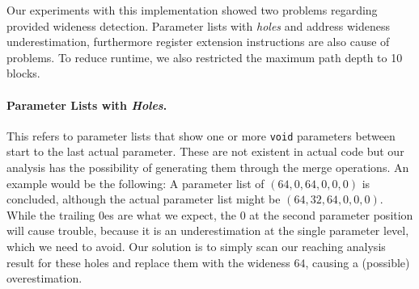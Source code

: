 %
%
%

Our experiments with this implementation showed two problems regarding provided wideness detection.  Parameter lists with \textit{holes} and address wideness underestimation, 
furthermore register extension instructions are also cause of problems. To reduce runtime, we also restricted the maximum path depth to 10 blocks.

\paragraph{Parameter Lists with \textit{Holes}.} This refers to parameter lists that show one or more \texttt{void} parameters between start to the last actual parameter. 
These are not existent in actual code but our analysis has the possibility of generating them through the merge operations. An example would be the following: 
A parameter list of $(64, 0, 64, 0, 0, 0)$ is concluded, although the actual parameter list might be $(64, 32, 64, 0, 0, 0)$. While the trailing 0es are 
what we expect, the 0 at the second parameter position will cause trouble, because it is an underestimation at the single parameter level, which we need to avoid.
Our solution is to simply scan our reaching analysis result for these holes and replace them with the wideness $64$, causing a (possible) overestimation.

